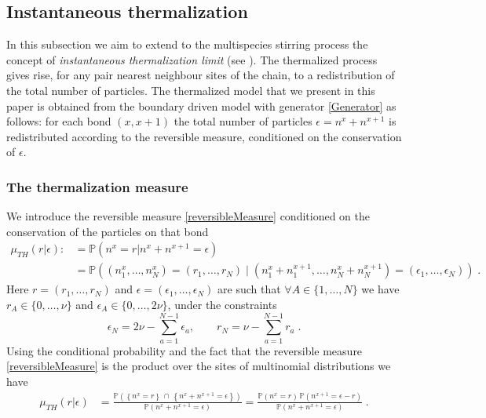 \documentclass[10pt]{article}
\numberwithin{equation}{section}
\numberwithin{equation}{subsection}
\newcommand{\dt}{\;.}
\begin{document}
\subsection{Instantaneous thermalization}\label{Subsection-Thermalized}
In this subsection we aim to extend to the multispecies stirring process the concept of \textit{instantaneous thermalization limit} (see \cite{carinci2013duality,KMP}). The thermalized process gives rise, for any pair nearest neighbour sites of the chain, to a redistribution of the total number of particles. The thermalized model that we present in this paper is obtained from the boundary driven model with generator \eqref{Generator} as follows: for each bond $(x,x+1)$ the total number of particles $\epsilon=n^{x}+n^{x+1}$ is redistributed according to the reversible measure, conditioned on the conservation of $\epsilon$. 
\subsubsection{The thermalization measure}
We introduce the reversible measure \eqref{reversibleMeasure} conditioned on the conservation of the particles on that bond
\begin{align}
	\mu_{TH}(r|\epsilon):&=\mathbb{P}\left(n^{x}=r|n^{x}+n^{x+1}=\epsilon\right)\nonumber
	\\&
	=\mathbb{P}\left((n_{1}^{x},\ldots,n_{N}^{x})=
	(r_{1},\ldots,r_{N})\;|\;(n_{1}^{x}+n_{1}^{x+1},\ldots,n_{N}^{x}+n_{N}^{x+1})=(\epsilon_{1},\ldots,\epsilon_{N})\right)\dt
\end{align}
Here $r=(r_{1},\ldots,r_{N})$ and  $\epsilon=(\epsilon_{1},\ldots,\epsilon_{N})$ are such that $\forall A\in\{1,\ldots,N\}$ we have $r_{A}\in \{0,\ldots,\nu\}$ and $\epsilon_{A}\in \{0,\ldots,2\nu\}$, under the constraints 
\begin{equation}
	\epsilon_{N}=2\nu-\sum_{a=1}^{N-1}\epsilon_{a},\qquad r_{N}=\nu-\sum_{a=1}^{N-1}r_{a}\dt
\end{equation}
 Using the conditional probability and the fact that the reversible measure \eqref{reversibleMeasure} is the product over the sites of multinomial distributions we have
\begin{equation}
	\begin{split}
\mu_{TH}(r|\epsilon)&=\frac{\mathbb{P}\left(\left\{n^{x}=r\right\}\,\cap\,\left\{n^{x}+n^{x+1}=\epsilon\right\}\right)}{\mathbb{P}\left(n^{x}+n^{x+1}=\epsilon\right)}=\frac{\mathbb{P}\left(n^{x}=r\right)\,\mathbb{P}\left(n^{x+1}=\epsilon-r\right)}{\mathbb{P}\left(n^{x}+n^{x+1}=\epsilon\right)}\dt
	\end{split}
\end{equation}
\end{document}
